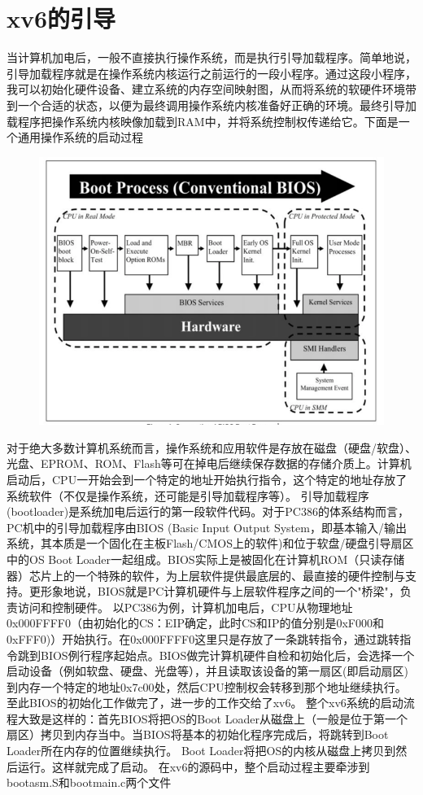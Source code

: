 \documentclass[a4paper,12pt]{report}
\begin{document}
\section{xv6的引导}
当计算机加电后，一般不直接执行操作系统，而是执行引导加载程序。简单地说，引导加载程序就是在操作系统内核运行之前运行的一段小程序。通过这段小程序，我可以初始化硬件设备、建立系统的内存空间映射图，从而将系统的软硬件环境带到一个合适的状态，以便为最终调用操作系统内核准备好正确的环境。最终引导加载程序把操作系统内核映像加载到RAM中，并将系统控制权传递给它。下面是一个通用操作系统的启动过程
\begin{figure}[H]
	\centering
	\includegraphics [width=1.0\textwidth]{figure//image87.png}
\end{figure}
对于绝大多数计算机系统而言，操作系统和应用软件是存放在磁盘（硬盘/软盘）、光盘、EPROM、ROM、Flash等可在掉电后继续保存数据的存储介质上。计算机启动后，CPU一开始会到一个特定的地址开始执行指令，这个特定的地址存放了系统软件（不仅是操作系统，还可能是引导加载程序等）。
引导加载程序(bootloader)是系统加电后运行的第一段软件代码。对于PC386的体系结构而言，PC机中的引导加载程序由BIOS (Basic Input Output System，即基本输入/输出系统，其本质是一个固化在主板Flash/CMOS上的软件)和位于软盘/硬盘引导扇区中的OS Boot Loader一起组成。BIOS实际上是被固化在计算机ROM（只读存储器）芯片上的一个特殊的软件，为上层软件提供最底层的、最直接的硬件控制与支持。更形象地说，BIOS就是PC计算机硬件与上层软件程序之间的一个"桥梁"，负责访问和控制硬件。
以PC386为例，计算机加电后，CPU从物理地址0x000FFFF0（由初始化的CS：EIP确定，此时CS和IP的值分别是0xF000和0xFFF0)）开始执行。在0x000FFFF0这里只是存放了一条跳转指令，通过跳转指令跳到BIOS例行程序起始点。BIOS做完计算机硬件自检和初始化后，会选择一个启动设备（例如软盘、硬盘、光盘等），并且读取该设备的第一扇区(即启动扇区)到内存一个特定的地址0x7c00处，然后CPU控制权会转移到那个地址继续执行。至此BIOS的初始化工作做完了，进一步的工作交给了xv6。
      整个xv6系统的启动流程大致是这样的：首先BIOS将把OS的Boot Loader从磁盘上（一般是位于第一个扇区）拷贝到内存当中。当BIOS将基本的初始化程序完成后，将跳转到Boot Loader所在内存的位置继续执行。 Boot Loader将把OS的内核从磁盘上拷贝到然后运行。这样就完成了启动。
在xv6的源码中，整个启动过程主要牵涉到bootasm.S和bootmain.c两个文件
\end{document}
